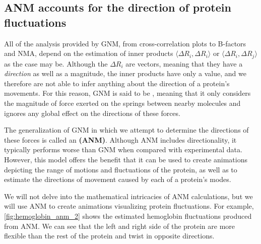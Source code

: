\FloatBarrier
{}
\subsection{ANM accounts for the direction of protein fluctuations}

All of the analysis provided by GNM, from cross-correlation plots to B-factors and NMA, depend on the estimation of inner products $ \langle \Delta R_i, \Delta R_i \rangle $ or $ \langle \Delta R_i, \Delta R_j \rangle $ as the case may be. Although the $ \Delta R_i $ are vectors, meaning that they have a \textit{direction} as well as a magnitude, the inner products have only a value, and we therefore are not able to infer anything about the direction of a protein's movements. For this reason, GNM is said to be , meaning that it only considers the magnitude of force exerted on the springs between nearby molecules and ignores any global effect on the directions of these forces.

The generalization of GNM in which we attempt to determine the directions of these forces is called an  \textbf{(ANM)}. Although ANM includes directionality, it typically performs worse than GNM when compared with experimental data. However, this model offers the benefit that it can be used to create animations depicting the range of motions and fluctuations of the protein, as well as to estimate the directions of movement caused by each of a protein's modes.

We will not delve into the mathematical intricacies of ANM calculations, but we will use ANM to create animations visualizing protein fluctuations. For example, \autoref{fig:hemoglobin_anm_2} shows the estimated hemoglobin fluctuations produced from ANM. We can see that the left and right side of the protein are more flexible than the rest of the protein and twist in opposite directions.

